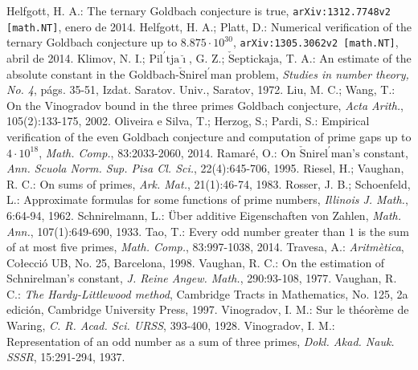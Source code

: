 \documentclass[11pt,a4paper,openright,oneside]{article}
\numberwithin{equation}{section}
\theoremstyle{definition}
\begin{document}
\begin{thebibliography}{25}
     Helfgott, H. A.: The ternary Goldbach conjecture is true, \newline \texttt{arXiv:1312.7748v2 [math.NT]}, enero de 2014.
     Helfgott, H. A.; Platt, D.: Numerical verification of the ternary Goldbach conjecture up to $8.875 \cdot 10^{30}$, \texttt{arXiv:1305.3062v2 [math.NT]}, abril de 2014.
     Klimov, N. I.; $\text{Pil}^{\prime} \text{tja}\breve{\imath}$, G. Z.; $\check{\text{S}}\text{eptickaja}$, T. A.: An estimate of the absolute constant in the Goldbach-$\check{\text{S}}\text{nirel}^{\prime} \text{man}$ problem, \textit{Studies in number theory, No. 4}, p\'ags. 35-51, Izdat. Saratov. Univ., Saratov, 1972.
     Liu, M. C.; Wang, T.: On the Vinogradov bound in the three primes Goldbach conjecture, \textit{Acta Arith.}, 105(2):133-175, 2002.
     Oliveira e Silva, T.; Herzog, S.; Pardi, S.: Empirical verification of the even Goldbach conjecture and computation of prime gaps up to $4\cdot10^{18}$, \textit{Math. Comp.}, 83:2033-2060, 2014.
     Ramar\'e, O.: On $\check{\text{S}}\text{nirel}^{\prime} \text{man's}$ constant, \textit{Ann. Scuola Norm. Sup. Pisa Cl. Sci.}, 22(4):645-706, 1995.
     Riesel, H.; Vaughan, R. C.: On sums of primes, \textit{Ark. Mat.}, 21(1):46-74, 1983.
     Rosser, J. B.; Schoenfeld, L.: Approximate formulas for some functions of prime numbers, \textit{Illinois J. Math.}, 6:64-94, 1962.
     Schnirelmann, L.: \"Uber additive Eigenschaften von Zahlen, \textit{Math. Ann.}, 107(1):649-690, 1933.
     Tao, T.: Every odd number greater than $1$ is the sum of at most five primes, \textit{Math. Comp.}, 83:997-1038, 2014.
     Travesa, A.: \textit{Aritm\`etica}, Co{\l}ecci\'o UB, No. 25, Barcelona, 1998.
     Vaughan, R. C.: On the estimation of Schnirelman's constant, \textit{J. Reine Angew. Math.}, 290:93-108, 1977.
     Vaughan, R. C.: \textit{The Hardy-Littlewood method}, Cambridge Tracts in Mathematics, No. 125, 2a edici\'on, Cambridge University Press, 1997.
     Vinogradov, I. M.: Sur le th\'eor\`eme de Waring, \textit{C. R. Acad. Sci. URSS}, 393-400, 1928.
     Vinogradov, I. M.: Representation of an odd number as a sum of three primes, \textit{Dokl. Akad. Nauk. SSSR}, 15:291-294, 1937.
\end{thebibliography}
\end{document}
